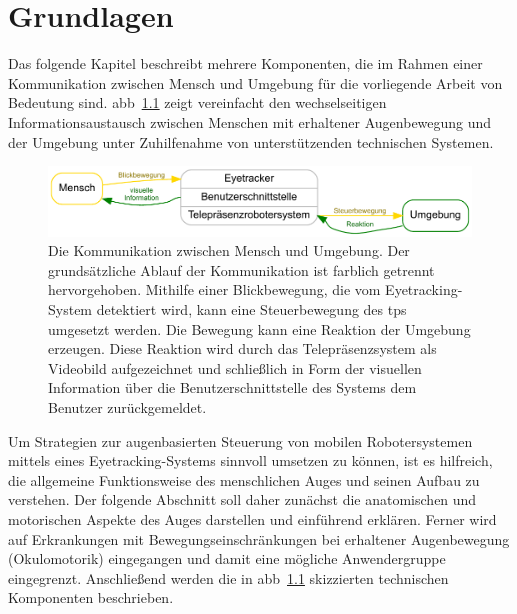 

\chapter{Grundlagen}
\label{chapter:grundlagen}

Das folgende Kapitel beschreibt mehrere Komponenten, die im Rahmen einer Kommunikation zwischen Mensch und Umgebung für die vorliegende Arbeit von Bedeutung sind. \acl{abb}~\ref{fig:infotrans} zeigt vereinfacht den wechselseitigen Informationsaustausch zwischen Menschen mit erhaltener Augenbewegung und der Umgebung unter Zuhilfenahme von unterstützenden technischen Systemen. 
\begin{figure}[ht]
\begin{minipage}[b]{\linewidth} 
      \centering 
\includegraphics[width=\textwidth]{bilder/grundlagen/simpltrans2.pdf} 
   \end{minipage}%
\caption{Die Kommunikation zwischen Mensch und Umgebung. Der grundsätzliche Ablauf der Kommunikation ist farblich getrennt hervorgehoben. Mithilfe einer Blickbewegung, die vom Eyetracking-System detektiert wird, kann eine Steuerbewegung des \acl{tps} umgesetzt werden. Die Bewegung kann eine Reaktion der Umgebung erzeugen. Diese Reaktion wird durch das Telepräsenzsystem als Videobild aufgezeichnet und schließlich in Form der visuellen Information über die Benutzerschnittstelle des Systems dem Benutzer zurückgemeldet.}
\label{fig:infotrans}
\end{figure}

Um Strategien zur augenbasierten Steuerung von mobilen Robotersystemen mittels eines Eyetracking-Systems sinnvoll umsetzen zu können, ist es hilfreich, die allgemeine Funktionsweise des menschlichen Auges und seinen Aufbau zu verstehen. Der folgende Abschnitt soll daher zunächst die anatomischen und motorischen Aspekte des Auges darstellen und einführend erklären. Ferner wird auf Erkrankungen mit Bewegungseinschränkungen bei erhaltener Augenbewegung (Okulomotorik) eingegangen und damit eine mögliche Anwendergruppe eingegrenzt. Anschließend werden die in \acs{abb}~\ref{fig:infotrans} skizzierten technischen Komponenten beschrieben. 

